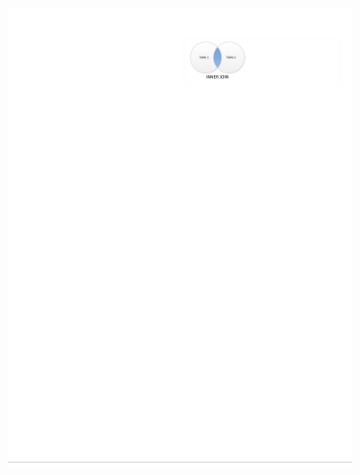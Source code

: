 \begin{figure}[H]
\begin{subfigure}[c]{0.3\textwidth}
  \includegraphics[width=\textwidth]{figures/sql/inner_join.pdf}
  \label{fig:sql:joins:inner_join}
  \end{subfigure}
  ~
  \begin{subfigure}[c]{0.3\textwidth}\centering

\end{subfigure}
\end{figure}
